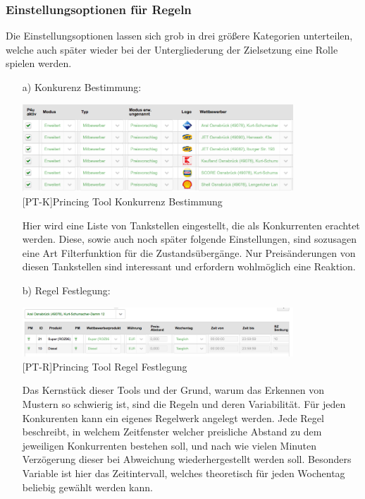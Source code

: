 \documentclass[12pt,a4paper,bibliography=totocnumbered,listof=totocnumbered]{scrartcl}
\begin{document}
\subsubsection{Einstellungsoptionen für Regeln}
Die Einstellungsoptionen lassen sich grob in drei größere Kategorien unterteilen, welche auch später wieder bei der Untergliederung der Zielsetzung eine Rolle spielen werden.
\newpage
\begin{enumerate}
\item[a)] Konkurenz Bestimmung:\\ 

\begin{center}
	\includegraphics[width=0.8\textwidth]{Bilder/konkurenz.png}\\
	[PT-K]{Princing Tool Konkurrenz Bestimmung}
	\label{fig:PT-K}
\end{center}
Hier wird eine Liste von Tankstellen eingestellt, die als Konkurrenten erachtet werden. Diese, sowie auch noch später folgende Einstellungen, sind sozusagen eine Art Filterfunktion für die Zustandsübergänge. Nur Preisänderungen von diesen Tankstellen sind interessant und erfordern wohlmöglich eine Reaktion.

\item[b)] Regel Festlegung:\\
\begin{center}
	\includegraphics[width=0.8\textwidth]{Bilder/regeln1.png}\\
	[PT-R]{Princing Tool Regel Festlegung}
	\label{fig:PT-R}
\end{center}
Das Kernstück dieser Tools und der Grund, warum das Erkennen von Mustern so schwierig ist, sind die Regeln und deren Variabilität. Für jeden Konkurenten kann ein eigenes Regelwerk angelegt werden. Jede Regel beschreibt, in welchem Zeitfenster welcher preisliche Abstand zu dem jeweiligen Konkurrenten bestehen soll, und nach wie vielen Minuten Verzögerung dieser bei Abweichung wiederhergestellt werden soll. Besonders Variable ist hier das Zeitintervall, welches theoretisch für jeden Wochentag beliebig gewählt werden kann.


\end{enumerate}
\end{document}
